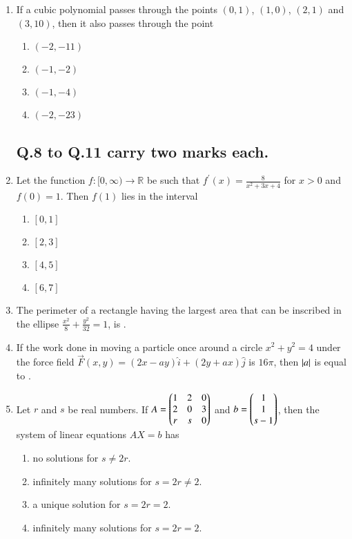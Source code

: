 \documentclass[journal]{IEEEtran}
\begin{document}
\begin{enumerate}
    \item If a cubic polynomial passes through the points $(0, 1)$, $(1, 0)$, $(2, 1)$ and $(3, 10)$, then it also passes through the point 
        \begin{enumerate}
            \item $(-2,-11)$
            \item $(-1,-2)$
            \item $(-1,-4)$
            \item $(-2,-23)$
        \end{enumerate}

\subsection*{Q.8 to Q.11 carry two marks each.}

    \item Let the function $f:[0,\infty)\to\mathbb{R}$ be such that $f^\prime(x)=\frac{8}{x^2+3x+4}$ for $x>0$ and $f(0)=1$. Then $f(1)$ lies in the interval
        \begin{enumerate}
            \item $[0,1]$
            \item $[2,3]$
            \item $[4,5]$
            \item $[6,7]$
        \end{enumerate}

    \item The perimeter of a rectangle having the largest area that can be inscribed in the ellipse $\frac{x^2}{8}+\frac{y^2}{32}=1$, is \underline{\hspace{1.5cm}}.

    \item If the work done in moving a particle once around a circle $x^2+y^2=4$ under the force field $\vec{F}(x,y)=(2x-ay)\hat{i}+(2y+ax)\hat{j}$ is $16\pi$, then $\left\vert a\right\vert$ is equal to \underline{\hspace{1.5cm}}.

    \item Let $r$ and $s$ be real numbers. If $A = \begin{pmatrix}1&2&0\\2&0&3\\r&s&0\end{pmatrix}$ and $b=\begin{pmatrix}1\\1\\s-1\end{pmatrix}$, then the system of linear equations $AX=b$ has
        \begin{enumerate}
            \item no solutions for $s\neq2r$.
            \item infinitely many solutions for $s=2r\neq2$.
            \item a unique solution for $s=2r=2$.
            \item infinitely many solutions for $s=2r=2$.
        \end{enumerate}


\end{enumerate}
\end{document}
